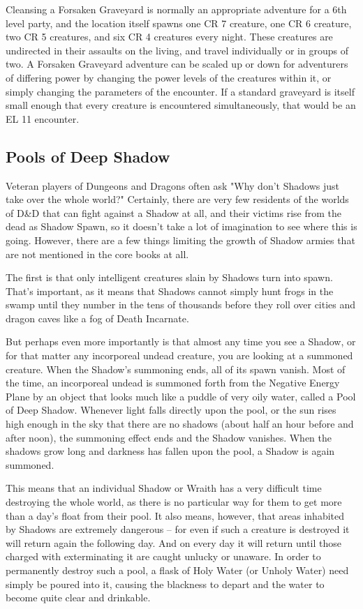 Cleansing a Forsaken Graveyard is normally an appropriate adventure for a 6th level party, and the location itself spawns one CR 7 creature, one CR 6 creature, two CR 5 creatures, and six CR 4 creatures every night. These creatures are undirected in their assaults on the living, and travel individually or in groups of two. A Forsaken Graveyard adventure can be scaled up or down for adventurers of differing power by changing the power levels of the creatures within it, or simply changing the parameters of the encounter. If a standard graveyard is itself small enough that every creature is encountered simultaneously, that would be an EL 11 encounter.

\subsection{Pools of Deep Shadow}

Veteran players of Dungeons and Dragons often ask "Why don't Shadows just take over the whole world?" Certainly, there are very few residents of the worlds of D\&D that can fight against a Shadow at all, and their victims rise from the dead as Shadow Spawn, so it doesn't take a lot of imagination to see where this is going. However, there are a few things limiting the growth of Shadow armies that are not mentioned in the core books at all.

The first is that only intelligent creatures slain by Shadows turn into spawn. That's important, as it means that Shadows cannot simply hunt frogs in the swamp until they number in the tens of thousands before they roll over cities and dragon caves like a fog of Death Incarnate.

But perhaps even more importantly is that almost any time you see a Shadow, or for that matter any incorporeal undead creature, you are looking at a summoned creature. When the Shadow's summoning ends, all of its spawn vanish. Most of the time, an incorporeal undead is summoned forth from the Negative Energy Plane by an object that looks much like a puddle of very oily water, called a Pool of Deep Shadow. Whenever light falls directly upon the pool, or the sun rises high enough in the sky that there are no shadows (about half an hour before and after noon), the summoning effect ends and the Shadow vanishes. When the shadows grow long and darkness has fallen upon the pool, a Shadow is again summoned.

This means that an individual Shadow or Wraith has a very difficult time destroying the whole world, as there is no particular way for them to get more than a day's float from their pool. It also means, however, that areas inhabited by Shadows are extremely dangerous -- for even if such a creature is destroyed it will return again the following day. And on every day it will return until those charged with exterminating it are caught unlucky or unaware. In order to permanently destroy such a pool, a flask of Holy Water (or Unholy Water) need simply be poured into it, causing the blackness to depart and the water to become quite clear and drinkable.

